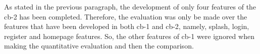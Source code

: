 As stated in the previous paragraph, the development of only four features of the cb-2 has been completed. Therefore, the evaluation was only be made over the features that have been developed in both cb-1 and cb-2, namely, splash, login, register and homepage features. So, the other features of cb-1 were ignored when making the quantitative evaluation and then the comparison.


